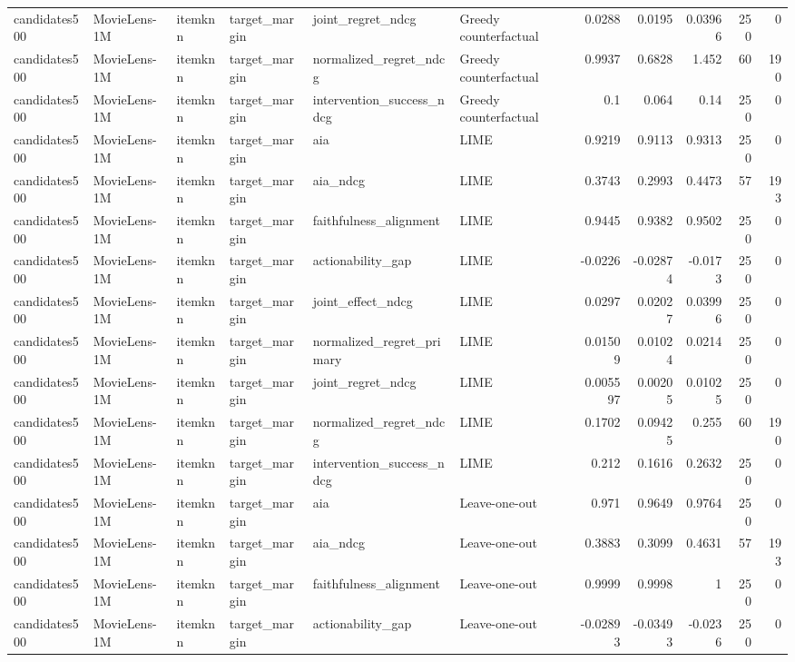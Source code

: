 \begin{table}[t]
{\begin{tabular}{llllllrrrrr}
candidates500 & MovieLens-1M & itemknn & target\_margin & joint\_regret\_ndcg & Greedy counterfactual & 0.0288 & 0.0195 & 0.03966 & 250 & 0 \\
candidates500 & MovieLens-1M & itemknn & target\_margin & normalized\_regret\_ndcg & Greedy counterfactual & 0.9937 & 0.6828 & 1.452 & 60 & 190 \\
candidates500 & MovieLens-1M & itemknn & target\_margin & intervention\_success\_ndcg & Greedy counterfactual & 0.1 & 0.064 & 0.14 & 250 & 0 \\
candidates500 & MovieLens-1M & itemknn & target\_margin & aia & LIME & 0.9219 & 0.9113 & 0.9313 & 250 & 0 \\
candidates500 & MovieLens-1M & itemknn & target\_margin & aia\_ndcg & LIME & 0.3743 & 0.2993 & 0.4473 & 57 & 193 \\
candidates500 & MovieLens-1M & itemknn & target\_margin & faithfulness\_alignment & LIME & 0.9445 & 0.9382 & 0.9502 & 250 & 0 \\
candidates500 & MovieLens-1M & itemknn & target\_margin & actionability\_gap & LIME & -0.0226 & -0.02874 & -0.0173 & 250 & 0 \\
candidates500 & MovieLens-1M & itemknn & target\_margin & joint\_effect\_ndcg & LIME & 0.0297 & 0.02027 & 0.03996 & 250 & 0 \\
candidates500 & MovieLens-1M & itemknn & target\_margin & normalized\_regret\_primary & LIME & 0.01509 & 0.01024 & 0.0214 & 250 & 0 \\
candidates500 & MovieLens-1M & itemknn & target\_margin & joint\_regret\_ndcg & LIME & 0.005597 & 0.00205 & 0.01025 & 250 & 0 \\
candidates500 & MovieLens-1M & itemknn & target\_margin & normalized\_regret\_ndcg & LIME & 0.1702 & 0.09425 & 0.255 & 60 & 190 \\
candidates500 & MovieLens-1M & itemknn & target\_margin & intervention\_success\_ndcg & LIME & 0.212 & 0.1616 & 0.2632 & 250 & 0 \\
candidates500 & MovieLens-1M & itemknn & target\_margin & aia & Leave-one-out & 0.971 & 0.9649 & 0.9764 & 250 & 0 \\
candidates500 & MovieLens-1M & itemknn & target\_margin & aia\_ndcg & Leave-one-out & 0.3883 & 0.3099 & 0.4631 & 57 & 193 \\
candidates500 & MovieLens-1M & itemknn & target\_margin & faithfulness\_alignment & Leave-one-out & 0.9999 & 0.9998 & 1 & 250 & 0 \\
candidates500 & MovieLens-1M & itemknn & target\_margin & actionability\_gap & Leave-one-out & -0.02893 & -0.03493 & -0.0236 & 250 & 0 \\

\end{tabular}}
\end{table}
